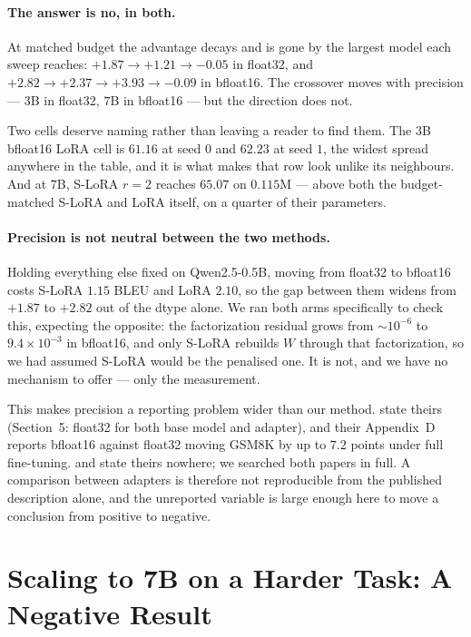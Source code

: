 \documentclass{article}
\theoremstyle{remark}
\begin{document}
\paragraph{The answer is no, in both.}
At matched budget the advantage decays and is gone by the largest model each
sweep reaches: $+1.87 \to +1.21 \to -0.05$ in float32, and
$+2.82 \to +2.37 \to +3.93 \to -0.09$ in bfloat16. The crossover moves with
precision --- $3$B in float32, $7$B in bfloat16 --- but the direction does not.

Two cells deserve naming rather than leaving a reader to find them. The $3$B
bfloat16 LoRA cell is $61.16$ at seed $0$ and $62.23$ at seed $1$, the widest
spread anywhere in the table, and it is what makes that row look unlike its
neighbours. And at $7$B, S-LoRA $r{=}2$ reaches $65.07$ on $0.115$M --- above
both the budget-matched S-LoRA and LoRA itself, on a quarter of their
parameters.

\paragraph{Precision is not neutral between the two methods.}
\label{par:precision}
Holding everything else fixed on Qwen2.5-0.5B, moving from float32 to bfloat16
costs S-LoRA $1.15$ BLEU and LoRA $2.10$, so the gap between them widens from
$+1.87$ to $+2.82$ out of the dtype alone. We ran both arms specifically to
check this, expecting the opposite: the factorization residual grows from
$\sim\!10^{-6}$ to $9.4\times 10^{-3}$ in bfloat16, and only S-LoRA rebuilds $W$
through that factorization, so we had assumed S-LoRA would be the penalised one.
It is not, and we have no mechanism to offer --- only the measurement.

This makes precision a reporting problem wider than our method.
\citet{meng2024pissa} state theirs (Section~5: float32 for both base model and
adapter), and their Appendix~D reports bfloat16 against float32 moving GSM8K by
up to $7.2$ points under full fine-tuning. \citet{hu2022lora} and
\citet{kopiczko2024vera} state theirs nowhere; we searched both papers in full.
A comparison between adapters is therefore not reproducible from the published
description alone, and the unreported variable is large enough here to move a
conclusion from positive to negative.

\section{Scaling to 7B on a Harder Task: A Negative Result}
\label{sec:scale}
\end{document}
